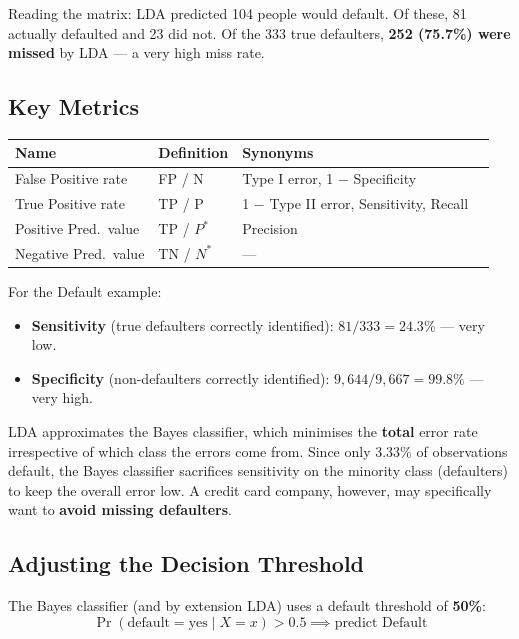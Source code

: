 \documentclass[11pt,a4paper]{article}
\theoremstyle{definition}
\theoremstyle{plain}
\theoremstyle{remark}
\begin{document}
Reading the matrix: LDA predicted 104 people would default. Of these, 81 actually defaulted and 23 did not. Of the 333 true defaulters, \textbf{252 (75.7\%) were missed} by LDA — a very high miss rate.

\subsection{Key Metrics}

\begin{center}
\begin{tabular}{llll}
\hline
Name & Definition & Synonyms \\
\hline
False Positive rate  & FP / N      & Type I error, 1 $-$ Specificity \\
True Positive rate   & TP / P      & 1 $-$ Type II error, Sensitivity, Recall \\
Positive Pred.\ value & TP / $P^*$ & Precision \\
Negative Pred.\ value & TN / $N^*$ & --- \\
\hline
\end{tabular}
\end{center}

For the Default example:
\begin{itemize}
    \item \textbf{Sensitivity} (true defaulters correctly identified): $81/333 = 24.3\%$ — very low.
    \item \textbf{Specificity} (non-defaulters correctly identified): $9{,}644/9{,}667 = 99.8\%$ — very high.
\end{itemize}

\begin{tcolorbox}[colback=orange!5!white,colframe=orange!75!black,title=\textbf{Why Does LDA Miss So Many Defaulters?}]
LDA approximates the Bayes classifier, which minimises the \textbf{total} error rate irrespective of which class the errors come from. Since only 3.33\% of observations default, the Bayes classifier sacrifices sensitivity on the minority class (defaulters) to keep the overall error low. A credit card company, however, may specifically want to \textbf{avoid missing defaulters}.
\end{tcolorbox}

\subsection{Adjusting the Decision Threshold}

The Bayes classifier (and by extension LDA) uses a default threshold of \textbf{50\%}:
\[
    \Pr(\text{default} = \text{yes} \mid X = x) > 0.5 \implies \text{predict Default}
\]
\end{document}
